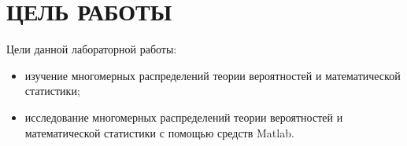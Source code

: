 \section{ЦЕЛЬ РАБОТЫ}

Цели данной лабораторной работы:

\begin{itemize}

\item
  изучение многомерных распределений теории вероятностей и математической статистики;
\item
  исследование многомерных распределений теории вероятностей и математической
  статистики с помощью средств Matlab.

\end{itemize}
